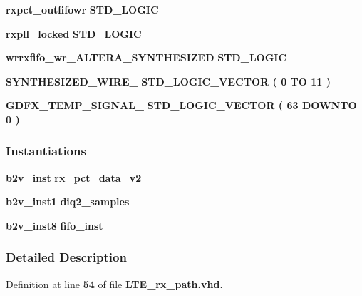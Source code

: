 \begin{DoxyCompactItemize}
{\bf rxpct\+\_\+outfifowr} {\bfseries \textcolor{comment}{S\+T\+D\+\_\+\+L\+O\+G\+IC}\textcolor{vhdlchar}{ }} 
\item 
{\bf rxpll\+\_\+locked} {\bfseries \textcolor{comment}{S\+T\+D\+\_\+\+L\+O\+G\+IC}\textcolor{vhdlchar}{ }} 
\item 
{\bf wrrxfifo\+\_\+wr\+\_\+\+A\+L\+T\+E\+R\+A\+\_\+\+S\+Y\+N\+T\+H\+E\+S\+I\+Z\+ED} {\bfseries \textcolor{comment}{S\+T\+D\+\_\+\+L\+O\+G\+IC}\textcolor{vhdlchar}{ }} 
\item 
{\bf S\+Y\+N\+T\+H\+E\+S\+I\+Z\+E\+D\+\_\+\+W\+I\+R\+E\+\_} {\bfseries \textcolor{comment}{S\+T\+D\+\_\+\+L\+O\+G\+I\+C\+\_\+\+V\+E\+C\+T\+OR}\textcolor{vhdlchar}{ }\textcolor{vhdlchar}{(}\textcolor{vhdlchar}{ }\textcolor{vhdlchar}{ } \textcolor{vhdldigit}{0} \textcolor{vhdlchar}{ }\textcolor{keywordflow}{TO}\textcolor{vhdlchar}{ }\textcolor{vhdlchar}{ } \textcolor{vhdldigit}{11} \textcolor{vhdlchar}{ }\textcolor{vhdlchar}{)}\textcolor{vhdlchar}{ }} 
\item 
{\bf G\+D\+F\+X\+\_\+\+T\+E\+M\+P\+\_\+\+S\+I\+G\+N\+A\+L\+\_} {\bfseries \textcolor{comment}{S\+T\+D\+\_\+\+L\+O\+G\+I\+C\+\_\+\+V\+E\+C\+T\+OR}\textcolor{vhdlchar}{ }\textcolor{vhdlchar}{(}\textcolor{vhdlchar}{ }\textcolor{vhdlchar}{ } \textcolor{vhdldigit}{63} \textcolor{vhdlchar}{ }\textcolor{keywordflow}{D\+O\+W\+N\+TO}\textcolor{vhdlchar}{ }\textcolor{vhdlchar}{ } \textcolor{vhdldigit}{0} \textcolor{vhdlchar}{ }\textcolor{vhdlchar}{)}\textcolor{vhdlchar}{ }} 
\end{DoxyCompactItemize}
\subsubsection*{Instantiations}
 \begin{DoxyCompactItemize}
\item 
{\bf b2v\+\_\+inst}  {\bfseries rx\+\_\+pct\+\_\+data\+\_\+v2}   
\item 
{\bf b2v\+\_\+inst1}  {\bfseries diq2\+\_\+samples}   
\item 
{\bf b2v\+\_\+inst8}  {\bfseries fifo\+\_\+inst}   
\end{DoxyCompactItemize}


\subsubsection{Detailed Description}


Definition at line {\bf 54} of file {\bf L\+T\+E\+\_\+rx\+\_\+path.\+vhd}.



